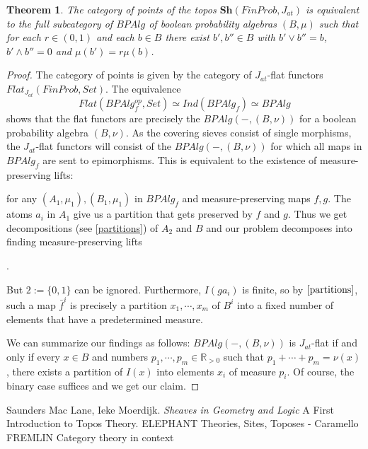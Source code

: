 \documentclass[a4paper]{amsproc}
\theoremstyle{plain}
\newtheorem{theorem}{Theorem}[section]
\theoremstyle{definition}
\theoremstyle{remark}
\numberwithin{equation}{section}
\begin{document}
\begin{theorem} The category of points of the topos $\textbf{Sh}(FinProb,J_{at})$ is equivalent to the full subcategory of $BPAlg$ of boolean probability algebras $(B,\mu)$ such that for each $r\in (0,1)$ and each $b\in B$ there exist $b', b''\in B$ with $b'\vee b''=b$, $b'\wedge b''=0$ and $\mu(b')=r\mu(b)$.\end{theorem}
\begin{proof} The category of points is given by the category of $J_{at}$-flat functors $Flat_{J_{at}}(FinProb, Set)$.  The equivalence 
\[
Flat(BPAlg_f^{op}, Set) \simeq Ind(BPAlg_f) \simeq BPAlg
\]
shows that the flat functors are precisely the $BPAlg(-,(B,\nu))$ for a boolean probability algebra $(B,\nu)$. As the covering sieves consist of single morphisms, the $J_{at}$-flat functors will consist of the $BPAlg(-,(B,\nu))$ for which all maps in $BPAlg_f$ are sent to epimorphisms. This is equivalent to the existence of measure-preserving lifts:
\begin{center}
\end{center}
for any $(A_1,\mu_1), (B_1,\mu_1)$ in $BPAlg_f$ and measure-preserving maps $f,g$. The atoms $a_i$ in $A_1$ give us a partition that gets preserved by $f$ and $g$. Thus we get decompositions (see \ref{partitions}) of $A_2$ and $B$ and our problem decomposes into finding measure-preserving lifts

\begin{center}
.
\end{center}
But $2 := \{0, 1\}$ can be ignored. Furthermore, $I(g a_i)$ is finite, so by $\ref{partitions}$, such a map $\bar{f}^i$ is precisely a partition $x_1, \cdots, x_m$ of $B^i$ into a fixed number of elements that have a predetermined measure.

We can summarize our findings as follows: $BPAlg(-, (B,\nu))$ is $J_{at}$-flat if and only if every $x \in B$ and numbers $p_1, \cdots, p_m \in \mathbb{R}_{>0}$ such that $p_1 + \cdots + p_m = \nu(x)$, there exists a partition of $I(x)$ into elements $x_i$ of measure $p_i$. Of course, the binary case suffices and we get our claim.
\end{proof}


\begin{thebibliography}{9}
Saunders Mac Lane, Ieke Moerdijk. \textit{Sheaves in Geometry and Logic} A First Introduction to Topos Theory.
ELEPHANT
Theories, Sites, Toposes - Caramello
FREMLIN
Category theory in context
\end{thebibliography}
\end{document}
